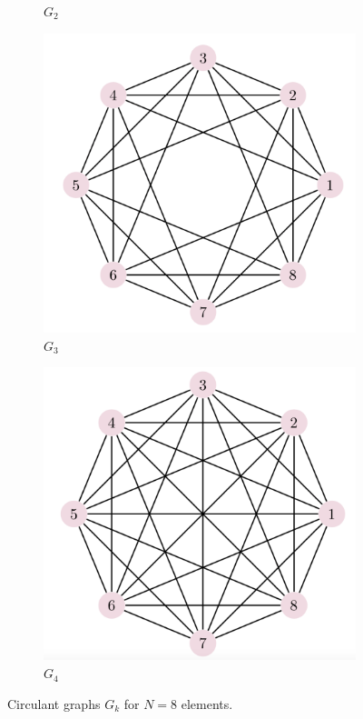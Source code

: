 \documentclass[../../dissertation.tex]{subfiles}
\begin{document}
\begin{figure}[!h]
\begin{subfigure}[t]{.23\textwidth}
    \caption{$G_2$}
  \end{subfigure}
  \begin{subfigure}[t]{.23\textwidth}
    \centering
    \includegraphics[width=\linewidth]{img/Qiskit/ContQuantumWalk/Graphs/graph2.png}
    \caption{$G_3$}
  \end{subfigure}
  \begin{subfigure}[t]{.23\textwidth}
    \centering
    \includegraphics[width=\linewidth]{img/Qiskit/ContQuantumWalk/Graphs/graph3.png}
    \caption{$G_4$}
  \end{subfigure}
  \caption{Circulant graphs $G_k$ for $N=8$ elements.}
  \label{fig:circulantGraphs}
\end{figure}
\end{document}
